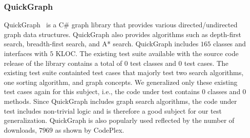 \subsubsection{QuickGraph}

QuickGraph~\cite{quickgraph} is a C\# graph library that provides various directed/undirected graph data structures. QuickGraph also provides algorithms such as depth-first search, breadth-first search, and A* search. QuickGraph includes $165$ classes and interfaces with $5$ KLOC. The existing test suite available with the source code release of the library contains a total of $0$ test classes and $0$ test cases. The existing test suite containted test cases that majorly test two search algorithms, one sorting algorithm, and graph concepts. We generalized only these existing test cases again for this subject, i.e., the code under test contains $0$ classes and $0$ methods. Since QuickGraph includes graph search algorithms, the code under test includes non-trivial logic and is therefore a good subject for our test generalization. QuickGraph is also popularly used reflected by the number of downloads, $7969$ as shown by CodePlex.



